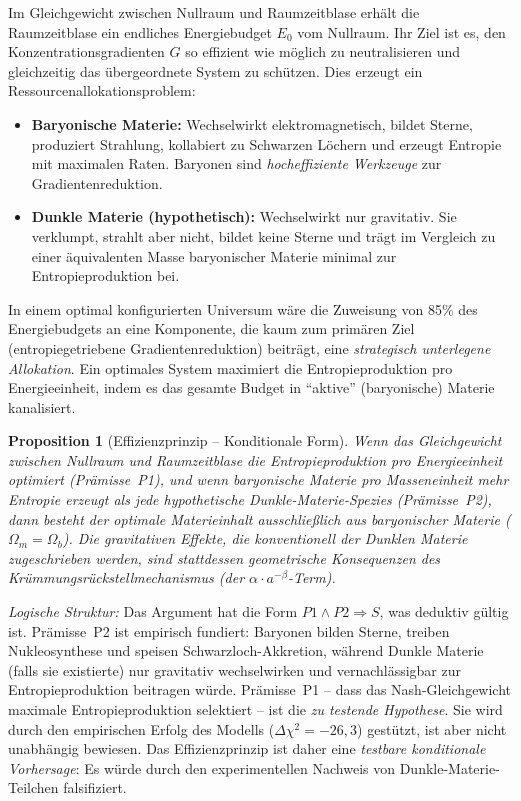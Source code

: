 \documentclass[aps,prd,twocolumn,superscriptaddress,nofootinbib,floatfix]{revtex4-2}
\newtheorem{proposition}{Proposition}
\begin{document}
Im Gleichgewicht zwischen Nullraum und Raumzeitblase \cite{Geiger2026} erhält die Raumzeitblase ein endliches Energiebudget $E_0$ vom Nullraum. Ihr Ziel ist es, den Konzentrationsgradienten $G$ so effizient wie möglich zu neutralisieren und gleichzeitig das übergeordnete System zu schützen. Dies erzeugt ein Ressourcenallokationsproblem:

\begin{itemize}
\item \textbf{Baryonische Materie:} Wechselwirkt elektromagnetisch, bildet Sterne, produziert Strahlung, kollabiert zu Schwarzen Löchern und erzeugt Entropie mit maximalen Raten. Baryonen sind \textit{hocheffiziente Werkzeuge} zur Gradientenreduktion.

\item \textbf{Dunkle Materie (hypothetisch):} Wechselwirkt nur gravitativ. Sie verklumpt, strahlt aber nicht, bildet keine Sterne und trägt im Vergleich zu einer äquivalenten Masse baryonischer Materie minimal zur Entropieproduktion bei.
\end{itemize}

In einem optimal konfigurierten Universum wäre die Zuweisung von 85\% des Energiebudgets an eine Komponente, die kaum zum primären Ziel (entropiegetriebene Gradientenreduktion) beiträgt, eine \textit{strategisch unterlegene Allokation}. Ein optimales System maximiert die Entropieproduktion pro Energieeinheit, indem es das gesamte Budget in "`aktive"' (baryonische) Materie kanalisiert.

\begin{proposition}[Effizienzprinzip -- Konditionale Form]
\textit{Wenn} das Gleichgewicht zwischen Nullraum und Raumzeitblase die Entropieproduktion pro Energieeinheit optimiert (Prämisse~P1), und \textit{wenn} baryonische Materie pro Masseneinheit mehr Entropie erzeugt als jede hypothetische Dunkle-Materie-Spezies (Prämisse~P2), \textit{dann} besteht der optimale Materieinhalt ausschließlich aus baryonischer Materie ($\Omega_m = \Omega_b$). Die gravitativen Effekte, die konventionell der Dunklen Materie zugeschrieben werden, sind stattdessen geometrische Konsequenzen des Krümmungsrückstellmechanismus (der $\alpha \cdot a^{-\beta}$-Term).
\end{proposition}

\textit{Logische Struktur:} Das Argument hat die Form $P1 \wedge P2 \Rightarrow S$, was deduktiv gültig ist. Prämisse~P2 ist empirisch fundiert: Baryonen bilden Sterne, treiben Nukleosynthese und speisen Schwarzloch-Akkretion, während Dunkle Materie (falls sie existierte) nur gravitativ wechselwirken und vernachlässigbar zur Entropieproduktion beitragen würde. Prämisse~P1 -- dass das Nash-Gleichgewicht maximale Entropieproduktion selektiert -- ist die \textit{zu testende Hypothese}. Sie wird durch den empirischen Erfolg des Modells ($\Delta\chi^2 = -26{,}3$) gestützt, ist aber nicht unabhängig bewiesen. Das Effizienzprinzip ist daher eine \textit{testbare konditionale Vorhersage}: Es würde durch den experimentellen Nachweis von Dunkle-Materie-Teilchen falsifiziert.
\end{document}
